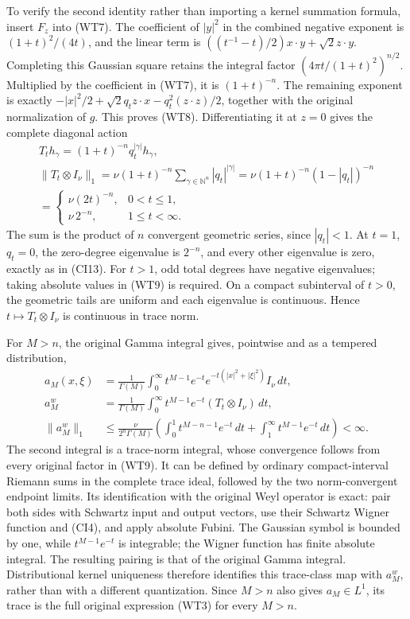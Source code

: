 \documentclass[
  11pt,
]{article}
\begin{document}
To verify the second identity rather than importing a kernel summation
formula, insert \(F_z\) into (WT7). The coefficient of \(|y|^2\) in the
combined negative exponent is \((1+t)^2/(4t)\), and the linear term is
\(((t^{-1}-t)/2)x\cdot y+\sqrt2 z\cdot y\). Completing this Gaussian
square retains the integral factor \((4\pi t/(1+t)^2)^{n/2}\).
Multiplied by the coefficient in (WT7), it is \((1+t)^{-n}\). The
remaining exponent is exactly
\(-|x|^2/2+\sqrt2 q_tz\cdot x-q_t^2(z\cdot z)/2\), together with the
original normalization of \(g\). This proves (WT8). Differentiating it
at \(z=0\) gives the complete diagonal action \[
 \begin{gathered}
 T_th_\gamma=(1+t)^{-n}q_t^{|\gamma|}h_\gamma,\\
 \|T_t\otimes I_\nu\|_1
 =\nu(1+t)^{-n}\sum_{\gamma\in\mathbb N^n}|q_t|^{|\gamma|}
 =\nu(1+t)^{-n}(1-|q_t|)^{-n}\\
 =\begin{cases}
       \nu(2t)^{-n},&0<t\leq1,\\
       \nu\,2^{-n},&1\leq t<\infty.
   \end{cases}
 \end{gathered}                                                  \tag{WT9}
\] The sum is the product of \(n\) convergent geometric series, since
\(|q_t|<1\). At \(t=1\), \(q_t=0\), the zero-degree eigenvalue is
\(2^{-n}\), and every other eigenvalue is zero, exactly as in (CI13).
For \(t>1\), odd total degrees have negative eigenvalues; taking
absolute values in (WT9) is required. On a compact subinterval of
\(t>0\), the geometric tails are uniform and each eigenvalue is
continuous. Hence \(t\mapsto T_t\otimes I_\nu\) is continuous in trace
norm.

For \(M>n\), the original Gamma integral gives, pointwise and as a
tempered distribution, \[
 \begin{split}
 a_M(x,\xi)&=\frac1{\Gamma(M)}
    \int_0^\infty t^{M-1}e^{-t}
            e^{-t(|x|^2+|\xi|^2)}I_\nu\,dt,\\
 a_M^w&=\frac1{\Gamma(M)}
    \int_0^\infty t^{M-1}e^{-t}(T_t\otimes I_\nu)\,dt,\\
 \|a_M^w\|_1&\leq\frac{\nu}{2^n\Gamma(M)}
     \left(\int_0^1t^{M-n-1}e^{-t}\,dt
                     +\int_1^\infty t^{M-1}e^{-t}\,dt\right)<\infty.
 \end{split}                                                     \tag{WT10}
\] The second integral is a trace-norm integral, whose convergence
follows from every original factor in (WT9). It can be defined by
ordinary compact-interval Riemann sums in the complete trace ideal,
followed by the two norm-convergent endpoint limits. Its identification
with the original Weyl operator is exact: pair both sides with Schwartz
input and output vectors, use their Schwartz Wigner function and (CI4),
and apply absolute Fubini. The Gaussian symbol is bounded by one, while
\(t^{M-1}e^{-t}\) is integrable; the Wigner function has finite absolute
integral. The resulting pairing is that of the original Gamma integral.
Distributional kernel uniqueness therefore identifies this trace-class
map with \(a_M^w\), rather than with a different quantization. Since
\(M>n\) also gives \(a_M\in L^1\), its trace is the full original
expression (WT3) for every \(M>n\).
\end{document}
